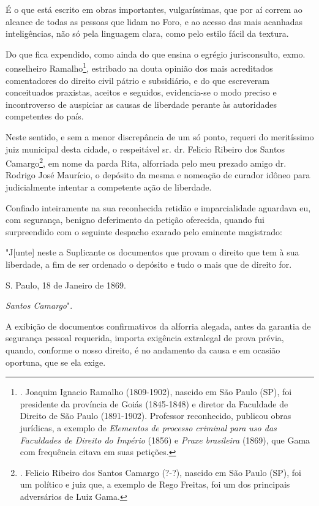 É o que está escrito em obras importantes, vulgaríssimas, que por aí
correm ao alcance de todas as pessoas que lidam no Foro, e ao acesso das
mais acanhadas inteligências, não só pela linguagem clara, como pelo
estilo fácil da textura.

Do que fica expendido, como ainda do que ensina o egrégio jurisconsulto,
exmo. conselheiro Ramalho\footnote{. Joaquim Ignacio Ramalho
  (1809-1902), nascido em São Paulo (SP), foi presidente da província de
  Goiás (1845-1848) e diretor da Faculdade de Direito de São Paulo
  (1891-1902). Professor reconhecido, publicou obras jurídicas, a
  exemplo de \emph{Elementos de processo criminal para uso das
  Faculdades de Direito do Império} (1856) e \emph{Praxe brasileira}
  (1869), que Gama com frequência citava em suas petições.}, estribado
na douta opinião dos mais acreditados comentadores do direito civil
pátrio e subsidiário, e do que escreveram conceituados praxistas,
aceitos e seguidos, evidencia-se o modo preciso e incontroverso de
auspiciar as causas de liberdade perante às autoridades competentes do
país.

Neste sentido, e sem a menor discrepância de um só ponto, requeri do
meritíssimo juiz municipal desta cidade, o respeitável sr. dr. Felicio
Ribeiro dos Santos Camargo\footnote{. Felicio Ribeiro dos Santos Camargo
  (?-?), nascido em São Paulo (SP), foi um político e juiz que, a
  exemplo de Rego Freitas, foi um dos principais adversários de Luiz
  Gama.}, em nome da parda Rita, alforriada pelo meu prezado amigo dr.
Rodrigo José Maurício, o depósito da mesma e nomeação de curador idôneo
para judicialmente intentar a competente ação de liberdade.

Confiado inteiramente na sua reconhecida retidão e imparcialidade
aguardava eu, com segurança, benigno deferimento da petição oferecida,
quando fui surpreendido com o seguinte despacho exarado pelo eminente
magistrado:

"J{[}unte{]} neste a Suplicante os documentos que provam o direito que
tem à sua liberdade, a fim de ser ordenado o depósito e tudo o mais que
de direito for.

S. Paulo, 18 de Janeiro de 1869.

\emph{Santos Camargo}".

A exibição de documentos confirmativos da alforria alegada, antes da
garantia de segurança pessoal requerida, importa exigência extralegal de
prova prévia, quando, conforme o nosso direito, é no andamento da causa
e em ocasião oportuna, que se ela exige.

